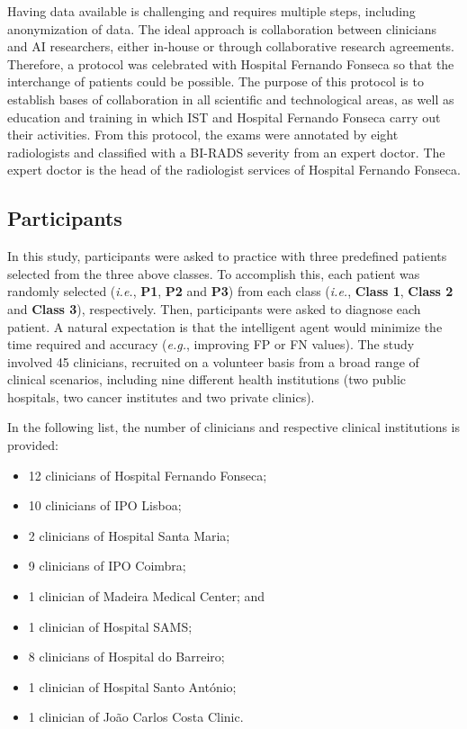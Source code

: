 Having data available is challenging and requires multiple steps, including anonymization of data.
The ideal approach is collaboration between clinicians and \ac{AI} researchers, either in-house or through collaborative research agreements.
Therefore, a protocol was celebrated with Hospital Fernando Fonseca so that the interchange of patients could be possible.
The purpose of this protocol is to establish bases of collaboration in all scientific and technological areas, as well as education and training in which \ac{IST} and Hospital Fernando Fonseca carry out their activities.
From this protocol, the exams were annotated by eight radiologists and classified with a \ac{BI-RADS} severity from an expert doctor.
The expert doctor is the head of the radiologist services of Hospital Fernando Fonseca.

\subsection{Participants}
\label{sec:chap005005001}

In this study, participants were asked to practice with three predefined patients selected from the three above classes.
To accomplish this, each patient was randomly selected ({\it i.e.}, {\bf P1}, {\bf P2} and {\bf P3}) from each class ({\it i.e.}, {\bf Class 1}, {\bf Class 2} and {\bf Class 3}), respectively.
Then, participants were asked to diagnose each patient.
A natural expectation is that the intelligent agent would minimize the time required and accuracy ({\it e.g.}, improving \ac{FP} or \ac{FN} values).
The study involved 45 clinicians, recruited on a volunteer basis from a broad range of clinical scenarios, including nine different health institutions (two public hospitals, two cancer institutes and two private clinics).

\hfill

\noindent
In the following list, the number of clinicians and respective clinical institutions is provided:

\begin{multicols}{2}
\begin{itemize}
\item 12 clinicians of Hospital Fernando Fonseca; %
\item 10 clinicians of IPO Lisboa; %
\item 2 clinicians of Hospital Santa Maria; %
\item 9 clinicians of IPO Coimbra; %
\item 1 clinician of Madeira Medical Center; and %
\item 1 clinician of Hospital SAMS; %
\item 8 clinicians of Hospital do Barreiro; %
\item 1 clinician of Hospital Santo Ant\'{o}nio; %
\item 1 clinician of Jo\~{a}o Carlos Costa Clinic. %
\end{itemize}
\end{multicols}

